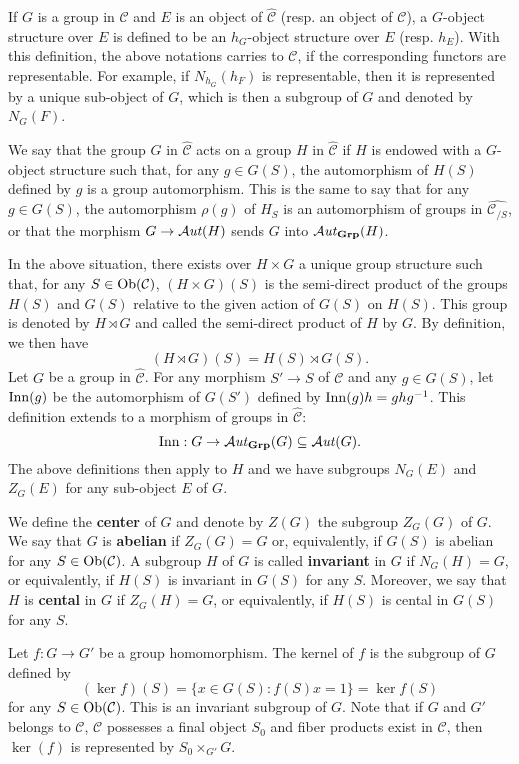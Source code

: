 If $G$ is a group in $\mathcal{C}$ and $E$ is an object of $\widehat{\mathcal{C}}$ (resp. an object of $\mathcal{C}$), a $G$-object structure over $E$ is defined to be an $h_G$-object structure over $E$ (resp. $h_E$). With this definition, the above notations carries to $\mathcal{C}$, if the corresponding functors are representable. For example, if $N_{h_G}(h_F)$ is representable, then it is represented by a unique sub-object of $G$, which is then a subgroup of $G$ and denoted by $N_G(F)$.\par
We say that the group $G$ in $\widehat{\mathcal{C}}$ acts on a group $H$ in $\widehat{\mathcal{C}}$ if $H$ is endowed with a $G$-object structure such that, for any $g\in G(S)$, the automorphism of $H(S)$ defined by $g$ is a group automorphism. This is the same to say that for any $g\in G(S)$, the automorphism $\rho(g)$ of $H_S$ is an automorphism of groups in $\widehat{\mathcal{C}_{/S}}$, or that the morphism $G\to\operatorname{\mathcal{A}\hspace*{-0.2pt}\textit{ut}\hspace{0.5pt}}(H)$ sends $G$ into $\operatorname{\mathcal{A}\hspace*{-0.2pt}\textit{ut}\hspace{0.5pt}}_{\mathbf{Grp}}(H)$.\par
In the above situation, there exists over $H\times G$ a unique group structure such that, for any $S\in\mathrm{Ob}(\mathcal{C})$, $(H\times G)(S)$ is the semi-direct product of the groups $H(S)$ and $G(S)$ relative to the given action of $G(S)$ on $H(S)$. This group is denoted by $H\rtimes G$ and called the semi-direct product of $H$ by $G$. By definition, we then have
\[(H\rtimes G)(S)=H(S)\rtimes G(S).\]
Let $G$ be a group in $\widehat{\mathcal{C}}$. For any morphism $S'\to S$ of $\mathcal{C}$ and any $g\in G(S)$, let $\mathrm{Inn}(g)$ be the automorphism of $G(S')$ defined by $\mathrm{Inn}(g)h=ghg^{-1}$. This definition extends to a morphism of groups in $\widehat{\mathcal{C}}$:
\[\mathrm{Inn}:G\to\operatorname{\mathcal{A}\hspace*{-0.2pt}\textit{ut}\hspace{0.5pt}}_{\mathbf{Grp}}(G)\subseteq\operatorname{\mathcal{A}\hspace*{-0.2pt}\textit{ut}\hspace{0.5pt}}(G).\]
The above definitions then apply to $H$ and we have subgroups $N_G(E)$ and $Z_G(E)$ for any sub-object $E$ of $G$.

\begin{definition}
We define the \textbf{center} of $G$ and denote by $Z(G)$ the subgroup $Z_G(G)$ of $G$. We say that $G$ is \textbf{abelian} if $Z_G(G)=G$ or, equivalently, if $G(S)$ is abelian for any $S\in\mathrm{Ob}(\mathcal{C})$. A subgroup $H$ of $G$ is called \textbf{invariant} in $G$ if $N_G(H)=G$, or equivalently, if $H(S)$ is invariant in $G(S)$ for any $S$. Moreover, we say that $H$ is \textbf{cental} in $G$ if $Z_G(H)=G$, or equivalently, if $H(S)$ is cental in $G(S)$ for any $S$.
\end{definition}

\begin{definition}
Let $f:G\to G'$ be a group homomorphism. The kernel of $f$ is the subgroup of $G$ defined by
\[(\ker f)(S)=\{x\in G(S):f(S)x=1\}=\ker f(S)\]
for any $S\in\mathrm{Ob}(\mathcal{C})$. This is an invariant subgroup of $G$. Note that if $G$ and $G'$ belongs to $\mathcal{C}$, $\mathcal{C}$ possesses a final object $S_0$ and fiber products exist in $\mathcal{C}$, then $\ker(f)$ is represented by $S_0\times_{G'}G$.
\end{definition}

